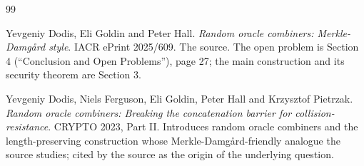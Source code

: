 \documentclass{aicr-conjecture}
\begin{document}
\begin{aicrbibliography}{99}

Yevgeniy Dodis, Eli Goldin and Peter Hall.
\emph{Random oracle combiners: Merkle-Damg\r{a}rd style}.
IACR ePrint 2025/609.
The source. The open problem is Section 4 (``Conclusion and Open
Problems''), page 27; the main construction and its security theorem
are Section 3.

Yevgeniy Dodis, Niels Ferguson, Eli Goldin, Peter Hall and Krzysztof
Pietrzak.
\emph{Random oracle combiners: Breaking the concatenation barrier for
collision-resistance}.
CRYPTO 2023, Part II\@.
Introduces random oracle combiners and the length-preserving
construction whose Merkle-Damg\r{a}rd-friendly analogue the source
studies; cited by the source as the origin of the underlying question.

\end{aicrbibliography}
\end{document}
